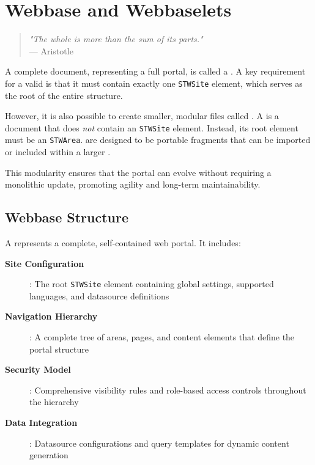 
\chapter{Webbase and Webbaselets}
\label{chap:webbaselets}

\begin{quote}
\textit{"The whole is more than the sum of its parts."} \\
— Aristotle
\end{quote}

A complete \wbdl{} document, representing a full portal, is called a \textbf{\webbase{}}. A key requirement for a valid \webbase{} is that it must contain exactly one \texttt{STWSite} element, which serves as the root of the entire structure.

However, it is also possible to create smaller, modular \wbdl{} files called \textbf{}. A \webbaselet{} is a \wbdl{} document that does \emph{not} contain an \texttt{STWSite} element. Instead, its root element must be an \texttt{STWArea}.  are designed to be portable fragments that can be imported or included within a larger \webbase{}.

This modularity ensures that the portal can evolve without requiring a monolithic update, promoting agility and long-term maintainability.

\section{Webbase Structure}
\label{sec:webbase-structure}

A \webbase{} represents a complete, self-contained web portal. It includes:

\begin{description}
\item[\textbf{Site Configuration}]: The root \texttt{STWSite} element containing global settings, supported languages, and datasource definitions
\item[\textbf{Navigation Hierarchy}]: A complete tree of areas, pages, and content elements that define the portal structure
\item[\textbf{Security Model}]: Comprehensive visibility rules and role-based access controls throughout the hierarchy
\item[\textbf{Data Integration}]: Datasource configurations and query templates for dynamic content generation
\end{description}

